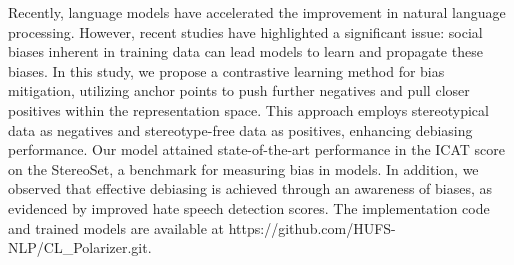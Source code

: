 Recently, language models have accelerated the improvement in natural language processing. However, recent studies have highlighted a significant issue: social biases inherent in training data can lead models to learn and propagate these biases. In this study, we propose a contrastive learning method for bias mitigation, utilizing anchor points to push further negatives and pull closer positives within the representation space. This approach employs stereotypical data as negatives and stereotype-free data as positives, enhancing debiasing performance. Our model attained state-of-the-art performance in the ICAT score on the StereoSet, a benchmark for measuring bias in models. In addition, we observed that effective debiasing is achieved through an awareness of biases, as evidenced by improved hate speech detection scores. The implementation code and trained models are available at https://github.com/HUFS-NLP/CL\_Polarizer.git.